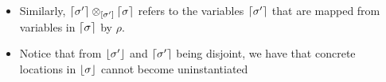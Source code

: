 \begin{notation}
\begin{itemize}
\begin{center}
        \end{center}
            which are exactly the $\varL{\sigma'}$ that are not mapped from any location $\anyL\sigma$ by $\rho$.
    \item Similarly, $\lceil\sigma'\rceil \otimes_{[\sigma']} \lceil\sigma\rceil$ refers to the variables $\varL{\sigma'}$ that are mapped from variables in $\lceil\sigma\rceil$ by $\rho$. 
        \begin{center}
        \end{center}
    \item Notice that from $\lfloor\sigma'\rfloor$ and $\varL{\sigma'}$ being disjoint, we have that concrete locations in $\lfloor\sigma\rfloor$ cannot become uninstantiated
        \begin{center}
        \end{center}
    \end{itemize}
\end{notation}


